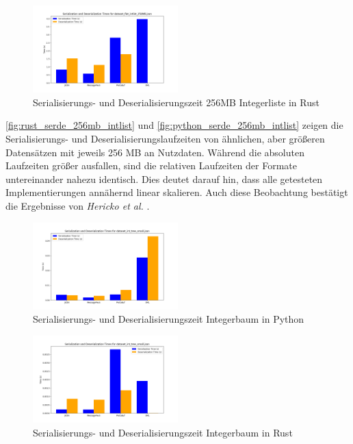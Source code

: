 \documentclass[ngerman]{seminarvorlage}
\begin{document}
\begin{figure}[h]
  \centering
  \includegraphics[width=0.5\textwidth]{images/graphs/rust_dataset_flat_intlist_256MB_json_combined_times.png}
  \caption{Serialisierungs- und Deserialisierungszeit 256MB Integerliste in Rust}
  \label{fig:rust_serde_256mb_intlist}
\end{figure}

\autoref{fig:rust_serde_256mb_intlist} und \autoref{fig:python_serde_256mb_intlist} zeigen die Serialisierungs- und Deserialisierungslaufzeiten von ähnlichen, aber größeren Datensätzen mit jeweils 256 MB an Nutzdaten. Während die absoluten Laufzeiten größer ausfallen, sind die relativen Laufzeiten der Formate untereinander nahezu identisch. Dies deutet darauf hin, dass alle getesteten Implementierungen annähernd linear skalieren. Auch diese Beobachtung bestätigt die Ergebnisse von \textit{Hericko et al.} \cite[Figure 9]{10.1145/944579.944589}.

\begin{figure}[h]
  \centering
  \includegraphics[width=0.5\textwidth]{images/graphs/python_dataset_int_tree_small_json_combined_times.png}
  \caption{Serialisierungs- und Deserialisierungszeit Integerbaum in Python}
  \label{fig:python_serde_8mb_inttree}
\end{figure}

\begin{figure}[h]
  \centering
  \includegraphics[width=0.5\textwidth]{images/graphs/rust_dataset_int_tree_small_json_combined_times.png}
  \caption{Serialisierungs- und Deserialisierungszeit Integerbaum in Rust}
  \label{fig:rust_serde_8mb_inttree}
\end{figure}
\end{document}
